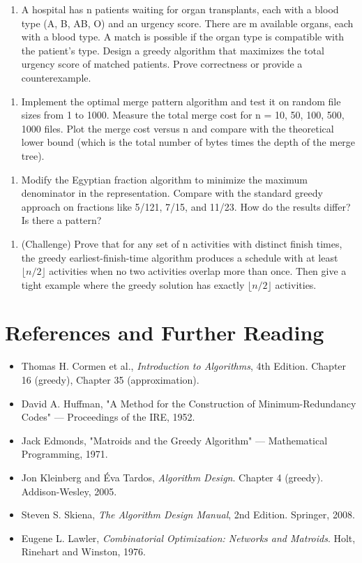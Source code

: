 \begin{enumerate}
\item A hospital has n patients waiting for organ transplants, each with a blood type (A, B, AB, O) and an urgency score. There are m available organs, each with a blood type. A match is possible if the organ type is compatible with the patient's type. Design a greedy algorithm that maximizes the total urgency score of matched patients. Prove correctness or provide a counterexample.
\end{enumerate}

\begin{enumerate}
\item Implement the optimal merge pattern algorithm and test it on random file sizes from 1 to 1000. Measure the total merge cost for n = 10, 50, 100, 500, 1000 files. Plot the merge cost versus n and compare with the theoretical lower bound (which is the total number of bytes times the depth of the merge tree).
\end{enumerate}

\begin{enumerate}
\item Modify the Egyptian fraction algorithm to minimize the maximum denominator in the representation. Compare with the standard greedy approach on fractions like 5/121, 7/15, and 11/23. How do the results differ? Is there a pattern?
\end{enumerate}

\begin{enumerate}
\item (Challenge) Prove that for any set of n activities with distinct finish times, the greedy earliest-finish-time algorithm produces a schedule with at least $\lfloor n/2 \rfloor$ activities when no two activities overlap more than once. Then give a tight example where the greedy solution has exactly $\lfloor n/2 \rfloor$ activities.
\end{enumerate}

\section{References and Further Reading}

\begin{itemize}
\item Thomas H. Cormen et al., \textit{Introduction to Algorithms}, 4th Edition. Chapter 16 (greedy), Chapter 35 (approximation).
\item David A. Huffman, "A Method for the Construction of Minimum-Redundancy Codes" — Proceedings of the IRE, 1952.
\item Jack Edmonds, "Matroids and the Greedy Algorithm" — Mathematical Programming, 1971.
\item Jon Kleinberg and \'Eva Tardos, \textit{Algorithm Design}. Chapter 4 (greedy). Addison-Wesley, 2005.
\item Steven S. Skiena, \textit{The Algorithm Design Manual}, 2nd Edition. Springer, 2008.
\item Eugene L. Lawler, \textit{Combinatorial Optimization: Networks and Matroids}. Holt, Rinehart and Winston, 1976.
\end{itemize}

